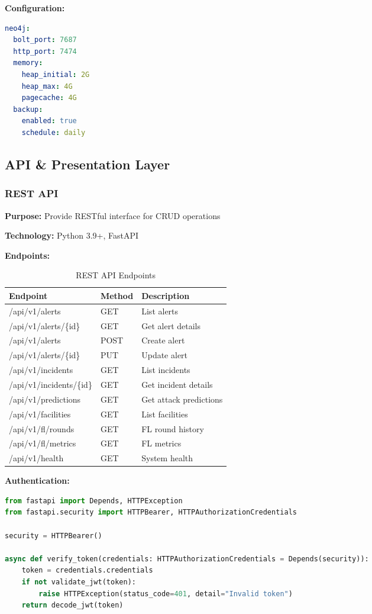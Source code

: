 \documentclass[12pt,a4paper]{article}
\begin{document}
\textbf{Configuration:}
\begin{lstlisting}[language=yaml]
neo4j:
  bolt_port: 7687
  http_port: 7474
  memory:
    heap_initial: 2G
    heap_max: 4G
    pagecache: 4G
  backup:
    enabled: true
    schedule: daily
\end{lstlisting}

\subsection{API \& Presentation Layer}

\subsubsection{REST API}

\textbf{Purpose:} Provide RESTful interface for CRUD operations

\textbf{Technology:} Python 3.9+, FastAPI

\textbf{Endpoints:}

\begin{table}[H]
\centering
\small
\begin{tabular}{|l|l|l|}
\hline
\textbf{Endpoint} & \textbf{Method} & \textbf{Description} \\
\hline
/api/v1/alerts & GET & List alerts \\
/api/v1/alerts/\{id\} & GET & Get alert details \\
/api/v1/alerts & POST & Create alert \\
/api/v1/alerts/\{id\} & PUT & Update alert \\
/api/v1/incidents & GET & List incidents \\
/api/v1/incidents/\{id\} & GET & Get incident details \\
/api/v1/predictions & GET & Get attack predictions \\
/api/v1/facilities & GET & List facilities \\
/api/v1/fl/rounds & GET & FL round history \\
/api/v1/fl/metrics & GET & FL metrics \\
/api/v1/health & GET & System health \\
\hline
\end{tabular}
\caption{REST API Endpoints}
\end{table}

\textbf{Authentication:}
\begin{lstlisting}[language=python]
from fastapi import Depends, HTTPException
from fastapi.security import HTTPBearer, HTTPAuthorizationCredentials

security = HTTPBearer()

async def verify_token(credentials: HTTPAuthorizationCredentials = Depends(security)):
    token = credentials.credentials
    if not validate_jwt(token):
        raise HTTPException(status_code=401, detail="Invalid token")
    return decode_jwt(token)
\end{lstlisting}
\end{document}
